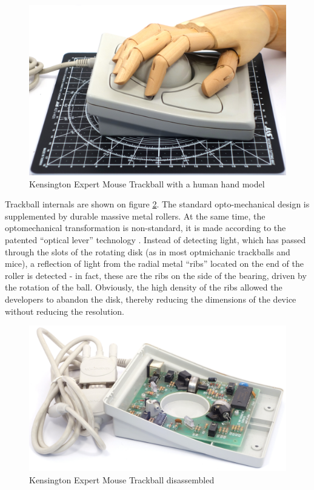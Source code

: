 \documentclass[11pt, a4paper]{article}
\begin{document}
\begin{figure}[h]
    \centering
    \includegraphics[scale=0.3]{1996_kensington_expert_trackball_5/hand_30.jpg}
    \caption{Kensington Expert Mouse Trackball with a human hand model}
    \label{fig:ExpertMouseHand}
\end{figure}

Trackball internals are shown on figure \ref{fig:ExpertMouseInside}. The standard opto-mechanical design is supplemented by durable massive metal rollers. At the same time, the optomechanical transformation is non-standard, it is made according to the patented “optical lever”  technology \cite{eu}. Instead of detecting light, which has passed through the slots of the rotating disk (as in most optmichanic trackballs and mice), a reflection of light from the radial metal “ribs” located on the end of the roller is detected - in fact, these are the ribs on the side of the bearing, driven by the rotation of the ball. Obviously, the high density of the ribs allowed the developers to abandon the disk, thereby reducing the dimensions of the device without reducing the resolution.

\begin{figure}[h]
    \centering
    \includegraphics[scale=0.65]{1996_kensington_expert_trackball_5/inside_60.jpg}
    \caption{Kensington Expert Mouse Trackball disassembled}
    \label{fig:ExpertMouseInside}
\end{figure}
\end{document}
